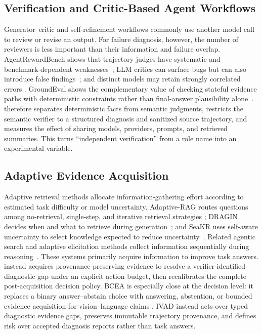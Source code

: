 \subsection{Verification and Critic-Based Agent Workflows}

Generator--critic and self-refinement workflows commonly use another model
call to review or revise an output. For failure diagnosis, however, the number
of reviewers is less important than their information and failure overlap.
AgentRewardBench shows that trajectory judges have systematic and
benchmark-dependent weaknesses~\cite{lu2025agentrewardbench}; LLM critics can
surface bugs but can also introduce false findings~\cite{mcaleese2024critics};
and distinct models may retain strongly correlated errors
\cite{kim2025correlated}. GroundEval shows the complementary value of checking
stateful evidence paths with deterministic constraints rather than final-answer
plausibility alone~\cite{flynt2026groundeval}.
\method therefore separates deterministic facts from semantic judgments,
restricts the semantic verifier to a structured diagnosis and sanitized source
trajectory, and measures the effect of sharing models, providers, prompts, and
retrieved summaries. This turns ``independent verification'' from a role name
into an experimental variable.

\subsection{Adaptive Evidence Acquisition}

Adaptive retrieval methods allocate information-gathering effort according to
estimated task difficulty or model uncertainty. Adaptive-RAG routes questions
among no-retrieval, single-step, and iterative retrieval strategies
\cite{jeong2024adaptiverag}; DRAGIN decides when and what to retrieve during
generation~\cite{su2024dragin}; and SeaKR uses self-aware uncertainty to select
knowledge expected to reduce uncertainty~\cite{yao2025seakr}. Related agentic
search and adaptive elicitation methods collect information sequentially during
reasoning~\cite{li2025searcho1,wang2025adaptiveelicitation}. These systems
primarily acquire information to improve task answers. \method instead
acquires provenance-preserving evidence to resolve a verifier-identified
diagnostic gap under an explicit action budget, then recalibrates the complete
post-acquisition decision policy. BCEA is especially close at the decision
level: it replaces a binary answer--abstain choice with answering, abstention,
or bounded evidence acquisition for vision--language claims
\cite{xu2026bcea}. IVAD instead acts over typed diagnostic evidence gaps,
preserves immutable trajectory provenance, and defines risk over accepted
diagnosis reports rather than task answers.

